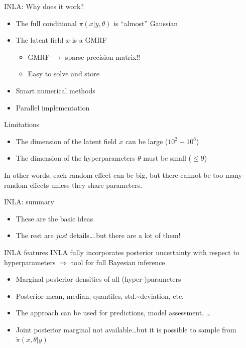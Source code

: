 \documentclass[
  ignorenonframetext,
]{beamer}
\providecommand{\tightlist}{%
  \setlength{\itemsep}{0pt}\setlength{\parskip}{0pt}}
\begin{document}
\begin{frame}{INLA: Why does it work?}
\protect\hypertarget{inla-why-does-it-work}{}
\begin{itemize}
\item
  The full conditional \(\pi(x|y,\theta)\) is ``almost'' Gaussian
\item
  The latent field \(x\) is a GMRF

  \begin{itemize}
  \tightlist
  \item
    GMRF \(\rightarrow\) sparse precision matrix!!
  \item
    Easy to solve and store
  \end{itemize}
\item
  Smart numerical methods
\item
  Parallel implementation
\end{itemize}
\end{frame}

\begin{frame}{Limitations}
\protect\hypertarget{limitations}{}
\begin{itemize}
\item
  The dimension of the latent field \(x\) can be large (\(10^2-10^6\))
\item
  The dimension of the hyperparameters \(\theta\) must be small
  (\(\leq 9\))
\end{itemize}

In other words, each random effect can be big, but there cannot be too
many random effects unless they share parameters.
\end{frame}

\begin{frame}{INLA: summary}
\protect\hypertarget{inla-summary}{}
\begin{itemize}
\item
  These are the basic ideas
\item
  The rest are \emph{just} details\ldots.but there are a lot of them!
\end{itemize}
\end{frame}

\begin{frame}{INLA features}
\protect\hypertarget{inla-features}{}
INLA fully incorporates posterior uncertainty with respect to
hyperparameters \(\Rightarrow\) tool for full Bayesian inference

\begin{itemize}
\tightlist
\item
  Marginal posterior densities of all (hyper-)parameters
\item
  Posterior mean, median, quantiles, std.\textasciitilde deviation, etc.
\item
  The approach can be used for predictions, model assessment, \ldots
\item
  Joint posterior marginal not available\ldots but it is possible to
  sample from \(\widetilde{\pi}(x,\theta|y)\)
\end{itemize}
\end{frame}
\end{document}
